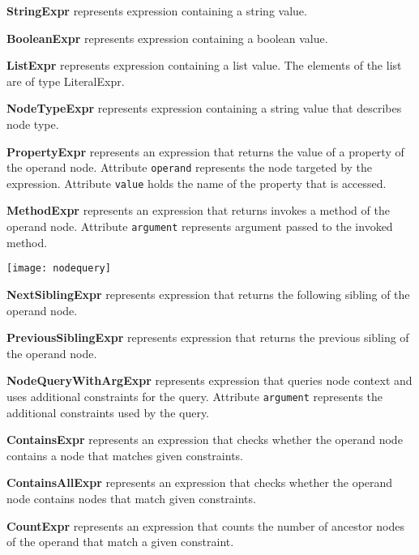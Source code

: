 \documentclass[parskip=full]{uvamscse}
\begin{document}
\begin{description}
\item\textbf{StringExpr} represents expression containing a string value.

\item\textbf{BooleanExpr} represents expression containing a boolean value.

\item\textbf{ListExpr} represents expression containing a list value. The elements of the list are of type LiteralExpr.

\item\textbf{NodeTypeExpr} represents expression containing a string value that describes node type.

\item\textbf{PropertyExpr} represents an expression that returns the value of a property of the operand node. Attribute \texttt{operand} represents the node targeted by the expression. Attribute \texttt{value} holds the name of the property that is accessed.

\item\textbf{MethodExpr} represents an expression that returns invokes a method of the operand node. Attribute \texttt{argument} represents argument passed to the invoked method.

\texttt{[image: nodequery]}

\item\textbf{NextSiblingExpr} represents expression that returns the following sibling of the operand node.

\item\textbf{PreviousSiblingExpr} represents expression that returns the previous sibling of the operand node.

\item\textbf{NodeQueryWithArgExpr} represents expression that queries node context and uses additional constraints for the query. Attribute \texttt{argument} represents the additional constraints used by the query.

\item\textbf{ContainsExpr} represents an expression that checks whether the operand node contains a node that matches given constraints.

\item\textbf{ContainsAllExpr} represents an expression that checks whether the operand node contains nodes that match given constraints.

\item\textbf{CountExpr} represents an expression that counts the number of ancestor nodes of the operand that match a given constraint.


\end{description}
\end{document}
